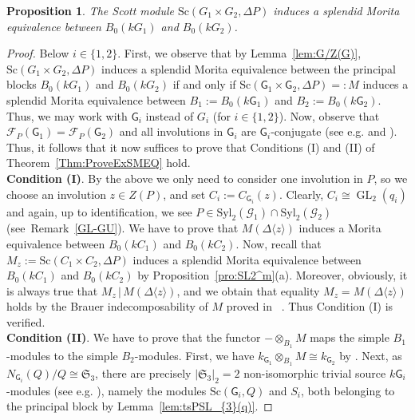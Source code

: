 \documentclass[12pt,a4paper]{amsart}
\theoremstyle{plain}\newtheorem{Theorem}{Theorem}[section]
\theoremstyle{plain}\newtheorem{Conjecture}[Theorem]{Conjecture}
\theoremstyle{plain}\newtheorem{Corollary}[Theorem]{Corollary}
\theoremstyle{plain}\newtheorem{Lemma}[Theorem]{Lemma}
\theoremstyle{plain}\newtheorem{Proposition}[Theorem]{Proposition}
\theoremstyle{definition}\newtheorem{Definition}[Theorem]{Definition}
\theoremstyle{definition}\newtheorem{Example}[Theorem]{Example}
\theoremstyle{definition}\newtheorem{Examples}[Theorem]{Examples}
\theoremstyle{definition}\newtheorem{Remark}[Theorem]{Remark}
\theoremstyle{definition}\newtheorem{Question}[Theorem]{Question}
\theoremstyle{definition}\newtheorem{Notation}[Theorem]{Notation}
\theoremstyle{definition}\newtheorem{Hypothesis}[Theorem]{Hypothesis}
\theoremstyle{definition}\newtheorem{Assumption}[Theorem]{Assumption}
\theoremstyle{definition}\newtheorem{Strategy}[Theorem]{Strategy}
\theoremstyle{definition}\newtheorem{Contents}[Theorem]{Contents}
\theoremstyle{definition}\newtheorem{Computations}[Theorem]{Computations}
\theoremstyle{definition}\newtheorem{Equivalences}[Theorem]{Equivalences}
\theoremstyle{definition}\newtheorem{Notation/Definition}[Theorem]{Notation/Definition}
\theoremstyle{definition}\newtheorem{noth}[Theorem]{}
\theoremstyle{plain}\newtheorem{Step}[Theorem]{Step}
\def\Syl{\mathrm{Syl}}
\newcommand{\GL}{\operatorname{GL}}
\newcommand{\Sc}{{\text{Sc}}}
\begin{document}
\begin{Proposition}\label{prop:PSL3Puig} 
The Scott module ${\mathrm{Sc}}(G_1\times G_2, \Delta P)$ induces a splendid 
Morita equivalence between $B_0(kG_1)$ and $B_0(kG_2)$. 
\end{Proposition}
%
\begin{proof} Below $i\in\{1,2\}$. First, we observe that by Lemma~\ref{lem:G/Z(G)}, ${\mathrm{Sc}}(G_1\times G_2, \Delta P)$ induces a splendid 
Morita equivalence between the principal blocks $B_0(kG_1)$ and $B_0(kG_2)$ if and only if 
$\Sc(\mathsf{G}_1\times \mathsf{G}_2, \Delta P)=:M$ induces a splendid Morita equivalence between 
$B_{1}:=B_0(k\mathsf{G}_1)$ and $B_{2}:=B_0(k\mathsf{G}_2)$. Thus, we may work with $\mathsf{G}_{i}$ instead of $G_{i}$ (for $i\in\{1,2\}$). 
Now, observe that 
$\mathcal F_P(\mathsf{G}_1)=\mathcal F_P(\mathsf{G}_2)$  and 
all involutions in $\mathsf{G}_i$ are $\mathsf{G}_i$-conjugate (see e.g. \cite[Theorem~5.3]{CG12} 
and \cite[Proposition~2 on p.11]{ABG70}).  Thus, it follows that it now suffices to prove that Conditions
(I) and (II) of Theorem~\ref{Thm:ProveExSMEQ} \smallskip hold.\\
%
{\bf Condition (I)}. 
By the above we only need to consider one involution in $P$, so we choose an involution $z\in Z(P)$,
and set $C_i:=C_{\mathsf{G}_i}(z)$. Clearly, $C_{i}\cong\GL_2(q_i)$ and again, 
up to identification, we see $P\in\Syl_2(\mathcal G_1)\cap\Syl_2(\mathcal G_2)$ (see~Remark~\ref{GL-GU}). 
We have to prove that $M(\Delta\langle z\rangle)$ 
induces a Morita equivalence between $B_0(kC_1)$ and $B_0(kC_2)$.  
Now, recall that $M_{z}:=\Sc(C_1\times C_2,\Delta P)$ induces a splendid Morita equivalence between $B_0(kC_1)$ and $B_0(kC_2)$
by Proposition~\ref{pro:SL2^m}(a). 
Moreover, obviously, it is always true that $M_z\,|\,M(\Delta\langle z\rangle)$,
and  we obtain that equality $M_z=M(\Delta\langle z\rangle)$  holds by the Brauer indecomposability 
of $M$ proved in ~\cite[Theorem~1.1]{KT20}. 
Thus Condition (I) is \smallskip verified.\\
%
{\bf Condition (II)}. We have to prove that the functor $-\otimes_{B_1}M$ maps the simple 
$B_{1}$-modules to the simple $B_{2}$-modules. 
First, we have $k_{\mathsf G_1}\otimes_{B_1}M\cong k_{\mathsf G_2}$ by \cite[Lemma~3.4(a)]{KL20a}.
Next, as  $N_{\mathsf{G}_i}(Q)/Q\cong\mathfrak S_3$, there are precisely $|\mathfrak{S}_{3}|_{2}=2$ non-isomorphic 
trivial source $k\mathsf{G}_{i}$-modules (see e.g. \cite[Theorem~4.6(c)]{Las23}), namely the modules $\Sc(\mathsf{G}_i,Q)$ and $S_i$, both belonging to the principal block by Lemma~\ref{lem:tsPSL_{3}(q)}.

\end{proof}
\end{document}
